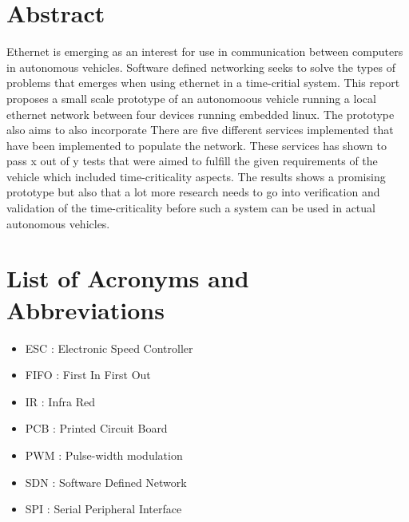 \documentclass[11pt, titlepage]{article} %
\begin{document}

\clearpage
\section*{Abstract}
Ethernet is emerging as an interest for use in communication between computers in autonomous vehicles. 
Software defined networking seeks to solve the types of problems that emerges when using ethernet in a time-critial system.
This report proposes a small scale prototype of an autonomoous vehicle running a local ethernet network between four devices running embedded linux.
The prototype also aims to also incorporate 
There are five different services implemented that have been implemented to populate the network.
These services has shown to pass x out of y tests that were aimed to fulfill the given requirements of the vehicle which included time-criticality aspects.
The results shows a promising prototype but also that a lot more research needs to go into verification and validation of the time-criticality before such a system can be used in actual autonomous vehicles.





\clearpage
\tableofcontents

\clearpage
\listoffigures

\clearpage
\listoftables

\clearpage
\section*{List of Acronyms and Abbreviations}
\begin{itemize}
        \item ESC : Electronic Speed Controller
        \item FIFO : First In First Out
        \item IR : Infra Red
        \item PCB : Printed Circuit Board
	\item PWM : Pulse-width modulation
	\item SDN : Software Defined Network
	\item SPI : Serial Peripheral Interface
\end{itemize}
\end{document}
